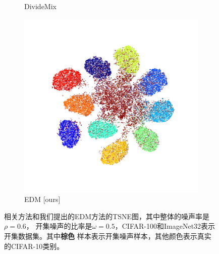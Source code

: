 \documentclass[11pt]{article}
\begin{document}
\begin{figure}[h]
\begin{subfigure}{.18\textwidth}
    \caption*{DivideMix~}
  \end{subfigure}
  \begin{subfigure}{.18\textwidth}
    \centering
    \includegraphics[width=\linewidth]{images/tsne/tsne_EDM_cifar100_D.png}
    \caption*{EDM [ours]}
  \end{subfigure}
  \caption{相关方法和我们提出的EDM方法的TSNE图，其中整体的噪声率是$\rho = 0.6$，
  开集噪声的比率是$\omega = 0.5$，CIFAR-100和ImageNet32表示开集数据集。其中\textbf{棕色}
  样本表示开集噪声样本，其他颜色表示真实的CIFAR-10类别。
  }
  \label{fig4}
\end{figure}
\end{document}
